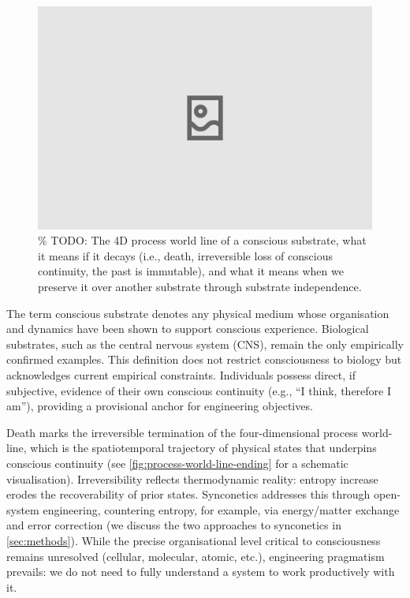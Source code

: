 \documentclass[10pt]{article}
\begin{document}
\begin{sloppypar}
  \begin{figure}[ht!]
    \centering
    \includegraphics[width=\textwidth]{figures/4D-process-world-line-ending.png}
    \caption{\% TODO: The 4D process world line of a conscious substrate, what it means if it decays (i.e., death, irreversible loss of conscious continuity, the past is immutable), and what it means when we preserve it over another substrate through substrate independence.}
    \label{fig:process-world-line-ending}
  \end{figure}

  The term conscious substrate denotes any physical medium whose organisation and dynamics have been shown to support conscious experience. Biological substrates, such as the central nervous system (CNS), remain the only empirically confirmed examples. This definition does not restrict consciousness to biology but acknowledges current empirical constraints. Individuals possess direct, if subjective, evidence of their own conscious continuity (e.g., “I think, therefore I am”), providing a provisional anchor for engineering objectives.

  Death marks the irreversible termination of the four-dimensional process world-line, which is the spatiotemporal trajectory of physical states that underpins conscious continuity (see \autoref{fig:process-world-line-ending} for a schematic visualisation). Irreversibility reflects thermodynamic reality: entropy increase erodes the recoverability of prior states. Synconetics addresses this through open-system engineering, countering entropy, for example, via energy/matter exchange and error correction (we discuss the two approaches to synconetics in \autoref{sec:methods}). While the precise organisational level critical to consciousness remains unresolved (cellular, molecular, atomic, etc.), engineering pragmatism prevails: we do not need to fully understand a system to work productively with it.


\end{sloppypar}
\end{document}
